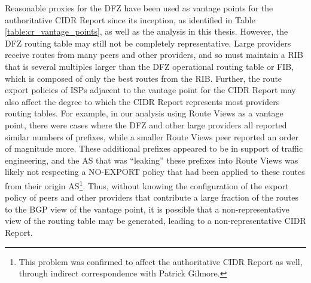 Reasonable proxies for the DFZ have been used as vantage points for the
authoritative CIDR Report since its inception, as identified in
Table \ref{table:cr_vantage_points}, as well as the analysis in this thesis.
However, the DFZ routing table may still not be completely representative.
Large providers receive routes from many peers and other providers, and so must
maintain a RIB that is several multiples larger than the DFZ operational
routing table or FIB, which is composed of only the best routes from the RIB.
Further, the route export policies of ISPs adjacent to the vantage point for
the CIDR Report may also affect the degree to which the CIDR Report represents
most providers routing tables. For example, in our analysis using Route Views
as a vantage point, there were cases where the DFZ and other large providers
all reported similar numbers of prefixes, while a smaller Route Views peer
reported an order of magnitude more. These additional prefixes appeared to be
in support of traffic engineering, and the AS that was ``leaking'' these
prefixes into Route Views was likely not respecting a NO-EXPORT policy that had
been applied to these routes from their origin AS\footnote{This problem was
confirmed to affect the authoritative CIDR Report as well, through indirect
correspondence with Patrick Gilmore.}. Thus, without knowing the configuration
of the export policy of peers and other providers that contribute a large
fraction of the routes to the BGP view of the vantage point, it is possible
that a non-representative view of the routing table may be generated, leading
to a non-representative CIDR Report.

%

